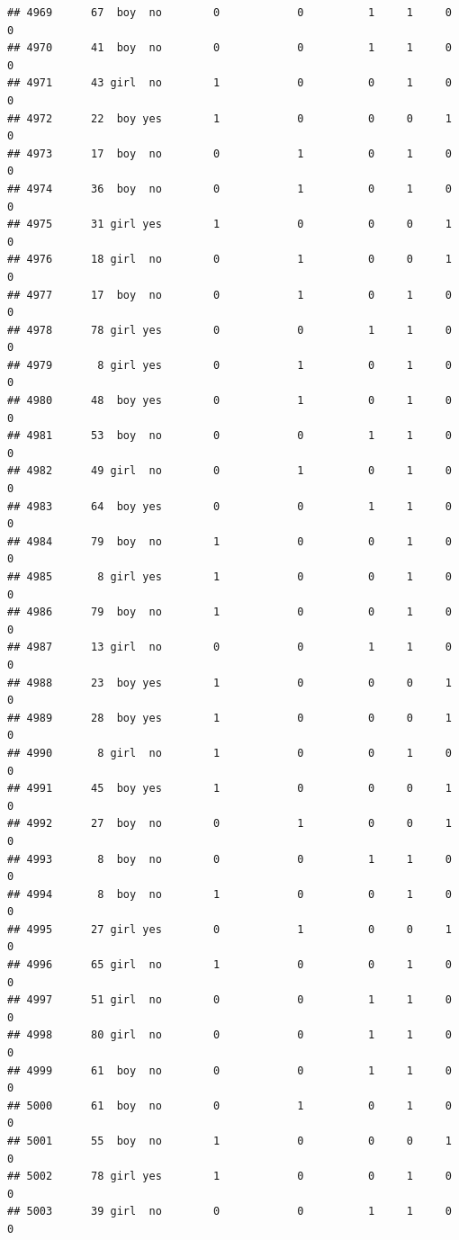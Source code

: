 \documentclass[man]{apa6}
\begin{document}
\begin{verbatim}
## 4969      67  boy  no        0            0          1     1     0     0
## 4970      41  boy  no        0            0          1     1     0     0
## 4971      43 girl  no        1            0          0     1     0     0
## 4972      22  boy yes        1            0          0     0     1     0
## 4973      17  boy  no        0            1          0     1     0     0
## 4974      36  boy  no        0            1          0     1     0     0
## 4975      31 girl yes        1            0          0     0     1     0
## 4976      18 girl  no        0            1          0     0     1     0
## 4977      17  boy  no        0            1          0     1     0     0
## 4978      78 girl yes        0            0          1     1     0     0
## 4979       8 girl yes        0            1          0     1     0     0
## 4980      48  boy yes        0            1          0     1     0     0
## 4981      53  boy  no        0            0          1     1     0     0
## 4982      49 girl  no        0            1          0     1     0     0
## 4983      64  boy yes        0            0          1     1     0     0
## 4984      79  boy  no        1            0          0     1     0     0
## 4985       8 girl yes        1            0          0     1     0     0
## 4986      79  boy  no        1            0          0     1     0     0
## 4987      13 girl  no        0            0          1     1     0     0
## 4988      23  boy yes        1            0          0     0     1     0
## 4989      28  boy yes        1            0          0     0     1     0
## 4990       8 girl  no        1            0          0     1     0     0
## 4991      45  boy yes        1            0          0     0     1     0
## 4992      27  boy  no        0            1          0     0     1     0
## 4993       8  boy  no        0            0          1     1     0     0
## 4994       8  boy  no        1            0          0     1     0     0
## 4995      27 girl yes        0            1          0     0     1     0
## 4996      65 girl  no        1            0          0     1     0     0
## 4997      51 girl  no        0            0          1     1     0     0
## 4998      80 girl  no        0            0          1     1     0     0
## 4999      61  boy  no        0            0          1     1     0     0
## 5000      61  boy  no        0            1          0     1     0     0
## 5001      55  boy  no        1            0          0     0     1     0
## 5002      78 girl yes        1            0          0     1     0     0
## 5003      39 girl  no        0            0          1     1     0     0

\end{verbatim}
\end{document}
